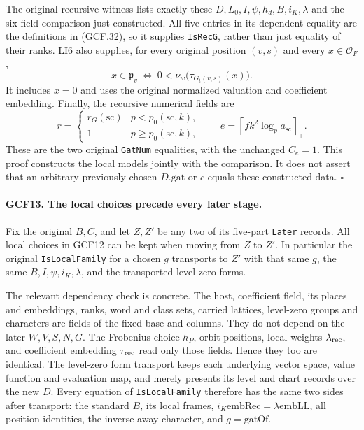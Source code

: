 The original recursive witness lists exactly these \(D,L_0,I,\psi,
h_d,B,i_K,\lambda\) and the six-field comparison just constructed.
All five entries in its dependent equality are the definitions in
(GCF.32), so it supplies \texttt{IsRecG}, rather than just equality
of their ranks.  LI6 also supplies, for every original position
\((v,s)\) and every \(x\in\mathcal O_F\),
\[
 x\in\mathfrak p_v
 \ \Longleftrightarrow\
  0<\nu_w\bigl(\tau_{G_t(v,s)}(x)\bigr).             \tag{GCF.35}
\]
It includes \(x=0\) and uses the original normalized valuation and
coefficient embedding.  Finally, the recursive numerical fields are
\[
 r=\begin{cases}r_G(\mathrm{sc})&p<p_0(\mathrm{sc},k),\\1&
                                  p\ge p_0(\mathrm{sc},k),
       \end{cases}\qquad
 e=\left\lceil f k^2\log_p a_{\mathrm{sc}}\right\rceil_+.
 \tag{GCF.36}
\]
These are the two original \texttt{GatNum} equalities, with the
unchanged \(C_e=1\).  This proof constructs the local models jointly
with the comparison.  It does not assert that an arbitrary previously
chosen \(D.\mathrm{gat}\) or \(c\) equals these constructed data.
\hfill\(\square\)

\paragraph{GCF13. The local choices precede every later stage.}
\label{claim:GCF13}
Fix the original \(B,C\), and let \(Z,Z'\) be any two of its
five-part \texttt{Later} records.  All local choices in GCF12 can be
kept when moving from \(Z\) to \(Z'\).  In particular the original
\texttt{IsLocalFamily} for a chosen \(g\) transports to \(Z'\)
with that same \(g\), the same \(B,I,\psi,i_K,\lambda\), and
the transported level-zero forms.

The relevant dependency check is concrete.  The host, coefficient
field, its places and embeddings, ranks, word and class sets, carried
lattices, level-zero groups and characters are fields of the fixed
base and columns.  They do not depend on the later
\(W,V,S,N,G\).  The Frobenius choice \(h_P\), orbit positions,
local weights \(\lambda_{\rm rec}\), and coefficient embedding
\(\tau_{\rm rec}\) read only those fields.  Hence they too are
identical.  The level-zero form transport keeps each underlying
vector space, value function and evaluation map, and merely presents
its level and chart records over the new \(D\).
Every equation of \texttt{IsLocalFamily} therefore has the same two
sides after transport: the standard \(B\), its local frames,
\(i_K\mathrm{embRec}=\lambda\mathrm{embLL}\), all position
identities, the inverse away character, and \(g=\mathrm{gatOf}\).

